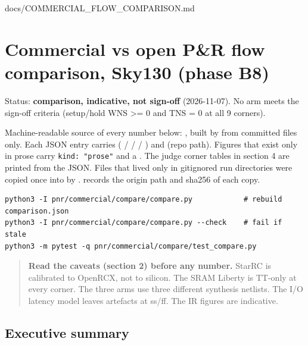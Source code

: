 \begin{relocated}{docs/COMMERCIAL_FLOW_COMPARISON.md}
\section{\texorpdfstring{Commercial vs open P\&R flow comparison, Sky130
 (phase
B8)}{Commercial vs open P\&R flow comparison, Sky130  (phase B8)}}\label{tm:pd:commercial-flow-comparison}

Status: \textbf{comparison, indicative, not sign-off} (2026-11-07). No
arm meets the sign-off criteria (setup/\allowbreak{}hold WNS
\textgreater= 0 and TNS = 0 at all 9 corners).

Machine-readable source of every number below:
, built by
 from committed files only. Each
JSON entry carries  ( /  /
 / ) and  (repo path). Figures
that exist only in prose carry \texttt{kind:\allowbreak{}\ "prose"} and
a . The judge corner tables in section 4 are printed from
the JSON. Files that lived only in gitignored run directories were
copied once into  by
.  records the
origin path and sha256 of each copy.

\begin{lstlisting}[language={}]
python3 -I pnr/commercial/compare/compare.py            # rebuild comparison.json
python3 -I pnr/commercial/compare/compare.py --check    # fail if stale
python3 -m pytest -q pnr/commercial/compare/test_compare.py
\end{lstlisting}

\begin{quote}
\textbf{Read the caveats (section 2) before any number.} StarRC is
calibrated to OpenRCX, not to silicon. The SRAM Liberty is TT-only at
every corner. The three arms use three different synthesis netlists. The
I/O latency model leaves artefacts at ss/ff. The IR figures are
indicative.
\end{quote}

\subsection{Executive summary}\label{tm:pd:commercial-flow-comparison:1-executive-summary}


\end{relocated}
